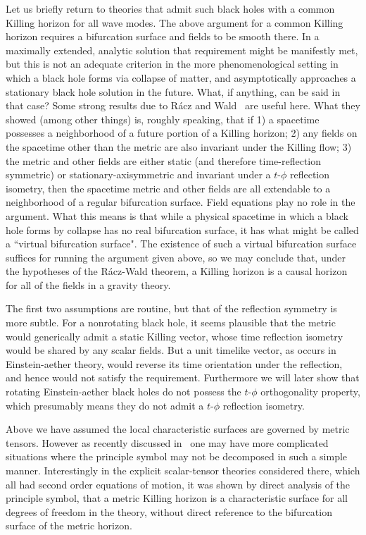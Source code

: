 \documentclass[12pt]{article}
\numberwithin{equation}{section}
\begin{document}
Let us briefly return to theories that admit such black holes with a common Killing horizon for all wave modes. 
 The above argument for a common 
Killing horizon
requires a bifurcation surface and fields to be smooth there.
In a maximally extended, analytic solution 
that requirement might be manifestly met, but this is not an
adequate criterion in the more phenomenological setting in
which a black hole forms via collapse of matter, and 
asymptotically approaches a stationary black hole solution in the future. 
What, if anything, can be said in that case? 
%
Some strong results due to R\'{a}cz and 
Wald~\cite{Racz:1995nh}
are useful here.
What they showed (among other things) is, roughly speaking,
that if  1) a spacetime possesses a 
neighborhood of a future portion of a Killing horizon; 
2) any fields on the spacetime other than the metric are also 
invariant under the Killing flow; 3) the metric and other fields
are either static
(and therefore time-reflection symmetric)
or stationary-axisymmetric 
and invariant under a 
$t$-$\phi$ reflection isometry, 
then
the spacetime metric 
and other fields are all extendable to a neighborhood
of a regular bifurcation surface. 
Field equations play no role in the argument. 
What this means is that while a physical spacetime 
in which a black hole forms by collapse has no real bifurcation surface, 
it has what might be called a ``virtual bifurcation surface". The existence
of such a virtual bifurcation surface suffices for running the argument
given above, so we may conclude that, under the hypotheses of the R\'{a}cz-Wald theorem,
a Killing horizon is a causal horizon for all of the fields in a 
gravity theory.

The first two assumptions are routine, but that
of the reflection symmetry is more subtle. 
For a nonrotating black hole, it seems plausible that
the metric would generically admit a static Killing vector,
whose time reflection isometry would be shared by any scalar
fields. 
But a unit timelike vector, as occurs in Einstein-aether theory,
would reverse its time orientation under the reflection, and hence would
not satisfy the requirement. 
Furthermore we will later show that rotating Einstein-aether black holes do not possess
 the $t$-$\phi$ orthogonality property, 
which presumably means they do not 
admit a $t$-$\phi$
reflection isometry.

Above we have assumed the local characteristic surfaces are governed by metric tensors. However as recently discussed in~\cite{Reall:2021voz} one may have more complicated situations where the principle symbol may not be decomposed in such a simple manner. Interestingly in the explicit scalar-tensor theories considered there, which all had second order equations of motion, it was shown by direct analysis of the principle symbol, that a metric Killing horizon is a characteristic surface for all degrees of freedom in the theory, without direct  reference to the bifurcation surface of the metric horizon.
\end{document}
